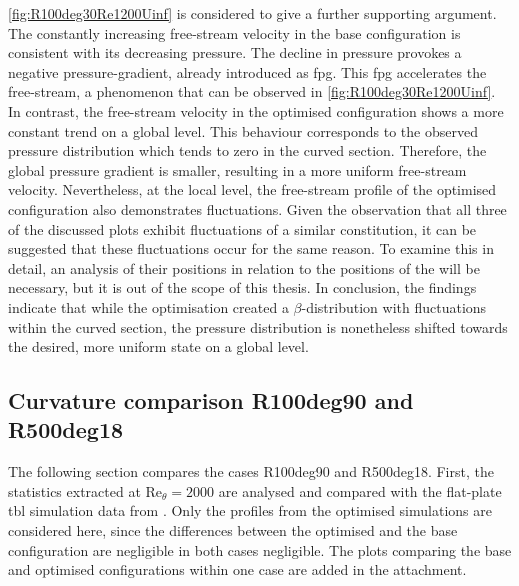 \autoref{fig:R100deg30Re1200Uinf} is considered to give a further supporting argument.
The constantly increasing free-stream velocity in the base configuration is consistent with its decreasing pressure.
The decline in pressure provokes a negative pressure-gradient, already introduced as \acrshort{fpg}.
This \acrshort{fpg} accelerates the free-stream, a phenomenon that can be observed in \autoref{fig:R100deg30Re1200Uinf}.
In contrast, the free-stream velocity in the optimised configuration shows a more constant trend on a global level.
This behaviour corresponds to the observed pressure distribution which tends to zero in the curved section.
Therefore, the global pressure gradient is smaller, resulting in a more uniform free-stream velocity.
Nevertheless, at the local level, the free-stream profile of the optimised configuration also demonstrates fluctuations.
Given the observation that all three of the discussed plots exhibit fluctuations of a similar constitution, it can be suggested that these fluctuations occur for the same reason.
To examine this in detail, an analysis of their positions in relation to the positions of the  will be necessary, but it is out of the scope of this thesis.
In conclusion, the findings indicate that while the optimisation created a $\beta$-distribution with fluctuations within the curved section, the pressure distribution is nonetheless shifted towards the desired, more uniform state on a global level.


\subsection{Curvature comparison R100deg90 and R500deg18}

The following section compares the cases R100deg90 and R500deg18.
First, the statistics extracted at $\mathrm{Re}_{\theta}=2000$ are analysed and compared with the flat-plate \acrshort{tbl} simulation data from \citet{schlatter_assessment_2010}.
Only the profiles from the optimised simulations are considered here, since the differences between the optimised and the base configuration are negligible in both cases negligible.
The plots comparing the base and optimised configurations within one case are added in the attachment.


